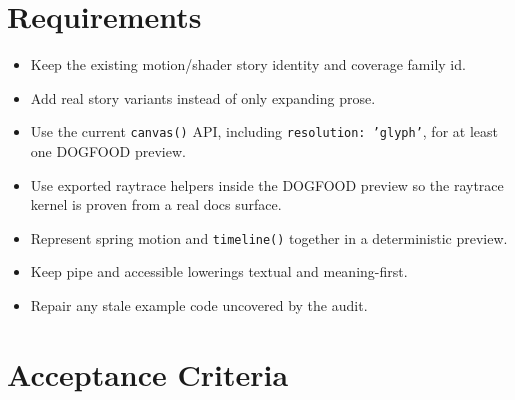 \section{Requirements}\label{record-098-requirements}

\begin{itemize}
\tightlist
\item
  Keep the existing motion/shader story identity and coverage family id.
\item
  Add real story variants instead of only expanding prose.
\item
  Use the current \texttt{c\allowbreak{}a\allowbreak{}n\allowbreak{}v\allowbreak{}a\allowbreak{}s\allowbreak{}(\allowbreak{})} API, including \texttt{r\allowbreak{}e\allowbreak{}s\allowbreak{}o\allowbreak{}l\allowbreak{}u\allowbreak{}t\allowbreak{}i\allowbreak{}o\allowbreak{}n\allowbreak{}:\allowbreak{} \allowbreak{}'\allowbreak{}g\allowbreak{}l\allowbreak{}y\allowbreak{}p\allowbreak{}h\allowbreak{}'}, for at least one DOGFOOD preview.
\item
  Use exported raytrace helpers inside the DOGFOOD preview so the raytrace kernel is proven from a real docs surface.
\item
  Represent spring motion and \texttt{t\allowbreak{}i\allowbreak{}m\allowbreak{}e\allowbreak{}l\allowbreak{}i\allowbreak{}n\allowbreak{}e\allowbreak{}(\allowbreak{})} together in a deterministic preview.
\item
  Keep pipe and accessible lowerings textual and meaning-first.
\item
  Repair any stale example code uncovered by the audit.
\end{itemize}

\section{Acceptance Criteria}\label{record-098-acceptance-criteria}


